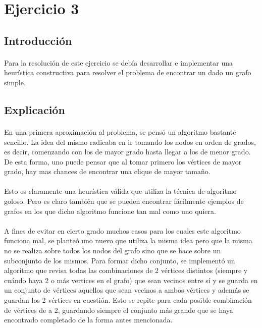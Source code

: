 \section{Ejercicio 3}

\subsection{Introducción}

\paragraph{}
Para la resolución de este ejercicio se debía desarrollar e implementar una heurística constructiva  para resolver el problema de encontrar un \mc dado un grafo simple.


\subsection{Explicación}

\paragraph{}
En una primera aproximación al problema, se pensó un algoritmo bastante sencillo. La idea del mismo radicaba en ir tomando los nodos en orden de grados, es decir, comenzando con los de mayor grado hasta llegar a los de menor grado. De esta forma, uno puede pensar que al tomar primero los vértices de mayor grado, hay mas chances de encontrar una clique de mayor tamaño.

\paragraph{}
Esto es claramente una heurística válida que utiliza la técnica de algoritmo goloso. Pero es claro también que se pueden encontrar fácilmente ejemplos de grafos en los que dicho algoritmo funcione tan mal como uno quiera.

\paragraph{}
A fines de evitar en cierto grado muchos casos para los cuales este algoritmo funciona mal, se planteó uno nuevo que utiliza la misma idea pero que la misma no se realiza sobre todos los nodos del grafo sino que se hace sobre un subconjunto de los mismos. Para formar dicho conjunto, se implementó un algoritmo que revisa todas las combinaciones de 2 vértices distintos (siempre y cuándo haya 2 o más vertices en el grafo) que sean vecinos entre sí y se guarda en un conjunto de vértices aquellos que sean vecinos a ambos vértices y además se guardan los 2 vértices en cuestión. Esto se repite para cada posible combinación de vértices de a 2, guardando siempre el conjunto más grande que se haya encontrado completado de la forma antes mencionada.

